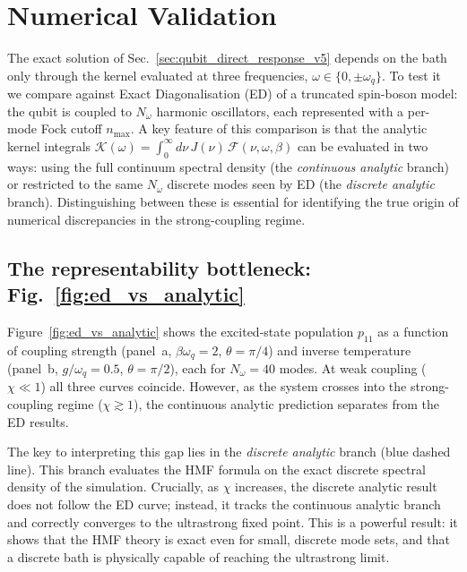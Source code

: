 \section{Numerical Validation}
\label{sec:numerical_results}

The exact solution of Sec.~\ref{sec:qubit_direct_response_v5} depends on the
bath only through the kernel evaluated at three frequencies,
$\omega \in \{0, \pm\omega_q\}$.
To test it we compare against Exact Diagonalisation (ED) of a truncated
spin-boson model: the qubit is coupled to $N_\omega$ harmonic oscillators,
each represented with a per-mode Fock cutoff $n_{\max}$.
A key feature of this comparison is that the analytic kernel integrals
$\mathcal{K}(\omega) = \int_0^\infty d\nu\, J(\nu)\, \mathcal{F}(\nu,\omega,\beta)$
can be evaluated in two ways: using the full continuum spectral density
(the \emph{continuous analytic} branch) or restricted to the same $N_\omega$
discrete modes seen by ED (the \emph{discrete analytic} branch).
Distinguishing between these is essential for identifying the true origin 
of numerical discrepancies in the strong-coupling regime.

\subsection*{The representability bottleneck: Fig.~\protect\ref{fig:ed_vs_analytic}}

Figure~\ref{fig:ed_vs_analytic} shows the excited-state population $p_{11}$
as a function of coupling strength (panel~a, $\beta\omega_q = 2$,
$\theta = \pi/4$) and inverse temperature (panel~b, $g/\omega_q = 0.5$,
$\theta = \pi/2$), each for $N_\omega = 40$ modes.
At weak coupling ($\chi \ll 1$) all three curves coincide.
However, as the system crosses into the strong-coupling regime ($\chi \gtrsim 1$),
the continuous analytic prediction separates from the ED results.

The key to interpreting this gap lies in the \emph{discrete analytic} branch
(blue dashed line). This branch evaluates the HMF formula on the exact
discrete spectral density of the simulation. Crucially, as $\chi$ increases,
the discrete analytic result does not follow the ED curve; instead, it
tracks the continuous analytic branch and correctly converges to the
ultrastrong fixed point. This is a powerful result: it shows that the HMF
theory is exact even for small, discrete mode sets, and that a discrete 
bath is physically capable of reaching the ultrastrong limit.

